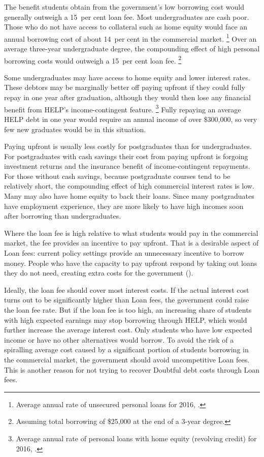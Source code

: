 \documentclass{grattan}
\begin{document}
The benefit students obtain from the government's low borrowing cost would generally outweigh a 15~per cent loan fee.
Most undergraduates are cash poor.
Those who do not have access to collateral such as home equity would face an annual borrowing cost of about 14~per cent in the commercial market.%
   \footnote{Average annual rate of unsecured personal loans for 2016, \textcite{RBA2016F5Indicatorlending}.}  %
Over an average three-year undergraduate degree, the compounding effect of high personal borrowing costs would outweigh a 15~per cent loan fee.%
   \footnote{Assuming total borrowing of \$25,000 at the end of a 3-year degree.} 

Some undergraduates may have access to home equity and lower interest rates.
These debtors may be marginally better off paying upfront if they could fully repay in one year after graduation, although they would then lose any financial benefit from \gls{HELP}'s income-contingent feature.%
   \footnote{Average annual rate of personal loans with home equity (revolving credit) for 2016, \textcite{RBA2016F5Indicatorlending}.} 
Fully repaying an average \gls{HELP} debt in one year would require an annual income of over \$300,000, so very few new graduates would be in this situation.

Paying upfront is usually less costly for postgraduates than for undergraduates.
For postgraduates with cash savings their cost from paying upfront is forgoing investment returns and the insurance benefit of income-contingent repayments.
For those without cash savings, because postgraduate courses tend to be relatively short, the compounding effect of high commercial interest rates is low.
Many may also have home equity to back their loans.
Since many postgraduates have employment experience, they are more likely to have high incomes soon after borrowing than undergraduates.

Where the loan fee is high relative to what students would pay in the commercial market, the fee provides an incentive to pay upfront.
That is a desirable aspect of \gls{Loan fees}: current policy settings provide an unnecessary incentive to borrow money.
People who have the capacity to pay upfront respond by taking out loans they do not need, creating extra costs for the government ().

Ideally, the loan fee should cover most interest costs.
If the actual interest cost turns out to be significantly higher than \gls{Loan fees}, the government could raise the loan fee rate.
But if the loan fee is too high, an increasing share of students with high expected earnings may stop borrowing through \gls{HELP}, which would further increase the average interest cost.
Only students who have low expected income or have no other alternatives would borrow.
To avoid the risk of a spiralling average cost caused by a significant portion of students borrowing in the commercial market, the government should avoid uncompetitive \gls{Loan fees}.
This is another reason for not trying to recover \gls{Doubtful debt} costs through \gls{Loan fees}.
\end{document}
